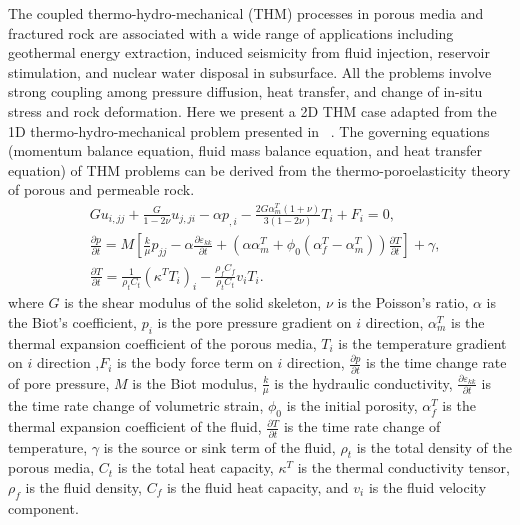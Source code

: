 The coupled thermo-hydro-mechanical (THM) processes in porous media and fractured rock are associated with a wide range of applications including geothermal energy extraction, induced seismicity from fluid injection, reservoir stimulation, and nuclear water disposal in subsurface. All the problems involve strong coupling among pressure diffusion, heat transfer, and change of in-situ stress and rock deformation. Here we present a 2D THM case adapted from the 1D thermo-hydro-mechanical problem presented in ~\cite{gao2020three}. 
The governing equations (momentum balance equation, fluid mass balance equation, and heat transfer equation) of THM problems can be derived from the thermo-poroelasticity theory of porous and permeable rock.
\begin{equation}
	\begin{aligned}
		& G u_{i,jj} + \frac{G}{1 - 2\nu} u_{j,ji} - \alpha p_{,i} - \frac{2G \alpha^T_m (1 + \nu)}{3(1 - 2\nu)} T_{i} + F_i = 0, \\
		& \frac{\partial p}{\partial t} = M \left[ \frac{k}{\mu} p_{jj} - \alpha \frac{\partial \varepsilon_{kk}}{\partial t} + \left( \alpha \alpha^T_m + \phi_0 (\alpha^T_f - \alpha^T_m) \right) \frac{\partial T}{\partial t} \right] + \gamma, \\
		& \frac{\partial T}{\partial t} = \frac{1}{\rho_t C_t} (\kappa^T T_i)_i - \frac{\rho_f C_f}{\rho_t C_t} v_i T_{i}.
	\end{aligned}
\end{equation}
where $G$ is the shear modulus of the solid skeleton, $\nu$ is the Poisson’s ratio, $\alpha $ is the Biot’s coefficient, $p_i$ is the pore pressure gradient on $i$ direction, $\alpha^T_m$ is the thermal expansion coefficient of the porous media, $T_i$ is the temperature gradient on $i$ direction ,$F_i$ is the body force term on $i$ direction, $\frac{\partial p}{\partial t}$ is the time change rate of pore pressure, $M$ is the Biot modulus, $\frac{k}{\mu}$ is the hydraulic conductivity, $\frac{\partial \varepsilon_{kk}}{\partial t}$ is the time rate change of volumetric strain, $\phi_0$ is the initial porosity, $\alpha^T_f$ is the thermal expansion coefficient of the fluid, $\frac{\partial T}{\partial t}$ is the time rate change of temperature, $\gamma$ is the source or sink term of the fluid, $\rho_t$ is the total density of the porous media, $\mathit{C_t}$ is the total heat capacity, $\kappa^T$ is the thermal conductivity tensor, $\rho_f$ is the fluid density, $\mathit{C_f}$ is the fluid heat capacity, and $\mathit{v_i}$ is the fluid velocity component.

